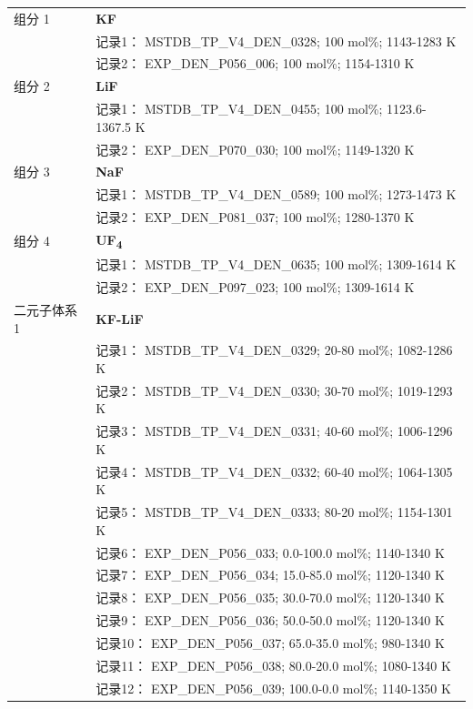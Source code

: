 \documentclass[12pt]{article}
\begin{document}
{\begin{longtable}[]{@{}
  >{\raggedright\arraybackslash}p{}
  >{\raggedright\arraybackslash}p{}@{}}
组分 1  & \textbf{KF} \\
 & 记录1： MSTDB\_TP\_V4\_DEN\_0328; 100 mol\%; 1143-1283 K \\
 & 记录2： EXP\_DEN\_P056\_006; 100 mol\%; 1154-1310 K  \\

组分 2  & \textbf{LiF} \\
 & 记录1： MSTDB\_TP\_V4\_DEN\_0455; 100 mol\%; 1123.6-1367.5 K \\
 & 记录2： EXP\_DEN\_P070\_030; 100 mol\%; 1149-1320 K  \\

组分 3  & \textbf{NaF} \\
 & 记录1： MSTDB\_TP\_V4\_DEN\_0589; 100 mol\%; 1273-1473 K \\
 & 记录2： EXP\_DEN\_P081\_037; 100 mol\%; 1280-1370 K  \\

组分 4  & \textbf{UF\textsubscript{4}} \\
 & 记录1： MSTDB\_TP\_V4\_DEN\_0635; 100 mol\%; 1309-1614 K \\
 & 记录2： EXP\_DEN\_P097\_023; 100 mol\%; 1309-1614 K  \\

二元子体系 1  & \textbf{KF-LiF} \\
 & 记录1： MSTDB\_TP\_V4\_DEN\_0329; 20-80 mol\%; 1082-1286 K \\
 & 记录2： MSTDB\_TP\_V4\_DEN\_0330; 30-70 mol\%; 1019-1293 K \\
 & 记录3： MSTDB\_TP\_V4\_DEN\_0331; 40-60 mol\%; 1006-1296 K \\
 & 记录4： MSTDB\_TP\_V4\_DEN\_0332; 60-40 mol\%; 1064-1305 K \\
 & 记录5： MSTDB\_TP\_V4\_DEN\_0333; 80-20 mol\%; 1154-1301 K \\
 & 记录6： EXP\_DEN\_P056\_033; 0.0-100.0 mol\%; 1140-1340 K \\
 & 记录7： EXP\_DEN\_P056\_034; 15.0-85.0 mol\%; 1120-1340 K \\
 & 记录8： EXP\_DEN\_P056\_035; 30.0-70.0 mol\%; 1120-1340 K \\
 & 记录9： EXP\_DEN\_P056\_036; 50.0-50.0 mol\%; 1120-1340 K \\
 & 记录10： EXP\_DEN\_P056\_037; 65.0-35.0 mol\%; 980-1340 K \\
 & 记录11： EXP\_DEN\_P056\_038; 80.0-20.0 mol\%; 1080-1340 K \\
 & 记录12： EXP\_DEN\_P056\_039; 100.0-0.0 mol\%; 1140-1350 K  \\


\end{longtable}}
\end{document}
